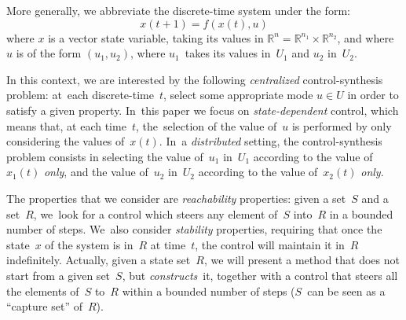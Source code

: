 More generally, we abbreviate the discrete-time system under
the form:
%
\[
x(t+1)=f(x(t),u)
\]
where $x$ is a vector state variable, taking
its values in $\mathbb{R}^n=\mathbb{R}^{n_1}\times \mathbb{R}^{n_2}$,
and where $u$ is of the form $(u_1,u_2)$,
where $u_1$~takes its values in~$U_1$ and $u_2$ in~$U_2$.

In this context, we are interested by the following \emph{centralized}
control-synthesis problem: at~each discrete-time~$t$, select some
appropriate mode $u\in U$ in order to satisfy a given
property. In~this paper we focus on \emph{state-dependent} control,
which means that, at each time~$t$, the~selection of the value of~$u$
is performed by only considering the values of~$x(t)$.
%
In~a \emph{distributed} setting, the control-synthesis problem
consists in selecting the value of~$u_1$ in~$U_1$ according to the
value of~$x_1(t)$ \emph{only}, and the value of~$u_2$ in~$U_2$
according to the value of~$x_2(t)$ \emph{only}.

The properties that we consider are \emph{reachability} properties:
given a set~$S$ and a set~$R$, we~look for a control which
steers any element of~$S$ into~$R$ in a bounded number of steps.
We~also consider \emph{stability} properties, requiring that
once the state~$x$ of the system is in~$R$ at time~$t$,
the control will maintain it in~$R$ indefinitely.
%
Actually, given a state set~$R$, we will present a method that
does not start from a given set~$S$, but \emph{constructs}~it,
together with a control that steers all the elements
of~$S$ to~$R$ within a bounded number of steps
($S$~can be seen as a ``capture set'' of~$R$).

